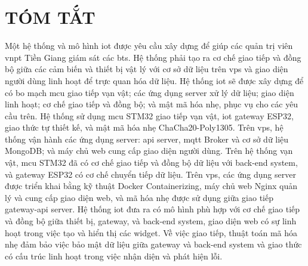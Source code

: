\chapter*{TÓM TẮT}
\label{Abstract}

Một hệ thống và mô hình \acrfull{iot} được yêu cầu xây dựng để giúp các quản trị viên \acrfull{vnpt} Tiền Giang giám sát các \acrfull{bts}. Hệ thống phải tạo ra cơ chế giao tiếp và đồng bộ giữa các cảm biến và thiết bị vật lý với cơ sở dữ liệu trên \acrfull{vps} và giao diện người dùng linh hoạt để trực quan hóa dữ liệu. 
Hệ thống \acrshort{iot} sẽ được xây dựng để có bo mạch \acrfull{mcu} giao tiếp vạn vật; các ứng dụng server xử lý dữ liệu; giao diện linh hoạt; cơ chế giao tiếp và đồng bộ; và mật mã hóa nhẹ, phục vụ cho các yêu cầu trên.
Hệ thống sử dụng \acrshort{mcu} STM32 giao tiếp vạn vật, \acrshort{iot} gateway ESP32, giao thức tự thiết kế, và mật mã hóa nhẹ ChaCha20-Poly1305. Trên \acrshort{vps}, hệ thống vận hành các ứng dụng server: \acrfull{api} server, \acrfull{mqtt} Broker và cơ sở dữ liệu MongoDB; và máy chủ web cung cấp giao diện người dùng. 
Trên hệ thống vạn vật, \acrshort{mcu} STM32 đã có cơ chế giao tiếp và đồng bộ dữ liệu với back-end system, và gateway ESP32 có cơ chế chuyển tiếp dữ liệu. Trên \acrshort{vps}, các ứng dụng server được triển khai bằng kỹ thuật Docker Containerizing, máy chủ web Nginx quản lý và cung cấp giao diện web, và mã hóa nhẹ được sử dụng giữa giao tiếp gateway-\acrshort{api} server. 
Hệ thống \acrshort{iot} đưa ra có mô hình phù hợp với cơ chế giao tiếp và đồng bộ giữa thiết bị, gateway, và back-end system, giao diện web có sự linh hoạt trong việc tạo và hiển thị các widget. Về việc giao tiếp, thuật toán mã hóa nhẹ đảm bảo việc bảo mật dữ liệu giữa gateway và back-end system và giao thức có cấu trúc linh hoạt trong việc nhận diện và phát hiện lỗi.
